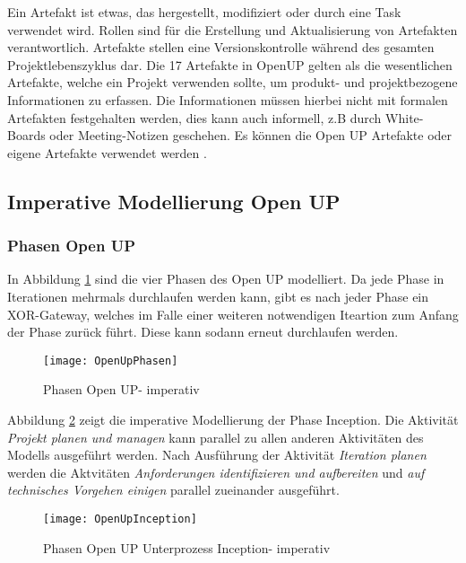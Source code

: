 Ein Artefakt ist etwas, das hergestellt, modifiziert oder durch eine Task verwendet wird. Rollen sind 
für die Erstellung und Aktualisierung von Artefakten verantwortlich. Artefakte stellen eine Versionskontrolle während des gesamten Projektlebenszyklus dar. Die 17 Artefakte in OpenUP gelten als die wesentlichen Artefakte, welche ein Projekt verwenden sollte, um produkt- und projektbezogene Informationen zu erfassen. Die Informationen müssen hierbei nicht mit formalen Artefakten festgehalten werden, dies kann auch informell, z.B durch White-Boards oder Meeting-Notizen geschehen. Es können die Open UP Artefakte oder eigene Artefakte verwendet werden \cite{eclipseopenup}.

\subsection{Imperative Modellierung Open UP}

 \subsubsection{Phasen Open UP}

In Abbildung \ref{fig:OpenUpPhasen} sind die vier Phasen des Open UP modelliert. Da jede Phase in Iterationen mehrmals durchlaufen werden kann, gibt es nach jeder Phase ein XOR-Gateway, welches im Falle einer weiteren notwendigen Iteartion zum Anfang der Phase zurück führt. Diese kann sodann erneut durchlaufen werden.

\begin{figure}[htp]
\begin{center}
  \texttt{[image: OpenUpPhasen]} %
  \caption{Phasen Open UP- imperativ}
  \label{fig:OpenUpPhasen}
\end{center}
\end{figure}

Abbildung \ref{fig:OpenUpInception} zeigt die imperative Modellierung der Phase Inception. Die Aktivität \textit{Projekt planen und managen} kann parallel zu allen anderen Aktivitäten des Modells ausgeführt werden.\newline
Nach Ausführung der Aktivität \textit{Iteration planen} werden die Aktvitäten \textit{Anforderungen identifizieren und aufbereiten} und \textit{auf technisches Vorgehen einigen} parallel zueinander ausgeführt.

\begin{figure}[htp]
\begin{center}
  \texttt{[image: OpenUpInception]} %
  \caption{Phasen Open UP Unterprozess Inception- imperativ}
  \label{fig:OpenUpInception}
\end{center}
\end{figure}

